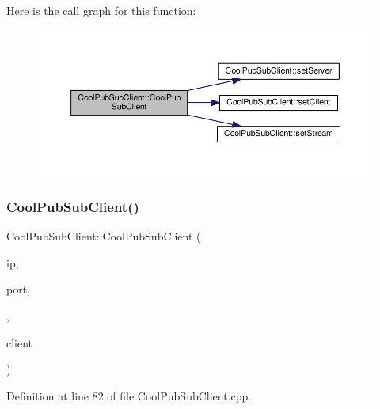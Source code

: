 Here is the call graph for this function\+:\nopagebreak
\begin{figure}[H]
\begin{center}
\leavevmode
\includegraphics[width=350pt]{class_cool_pub_sub_client_a3e7d7fa4b55e36f0ac8912335993d650_cgraph}
\end{center}
\end{figure}
\mbox{\label{class_cool_pub_sub_client_afc703702b40ba925377d0b9cd401319e}} 
\subsubsection{\texorpdfstring{Cool\+Pub\+Sub\+Client()}{CoolPubSubClient()}\hspace{0.1cm}{\footnotesize\ttfamily [9/14]}}
{\footnotesize\ttfamily Cool\+Pub\+Sub\+Client\+::\+Cool\+Pub\+Sub\+Client (\begin{DoxyParamCaption}\item[{uint8\+\_\+t $\ast$}]{ip,  }\item[{uint16\+\_\+t}]{port,  }\item[{\hyperlink{class_cool_pub_sub_client_a021ec75e9fbaf658370b8005ccfddc14}{M\+Q\+T\+T\+\_\+\+C\+A\+L\+L\+B\+A\+C\+K\+\_\+\+S\+I\+G\+N\+A\+T\+U\+RE}}]{,  }\item[{Client \&}]{client }\end{DoxyParamCaption})}



Definition at line 82 of file Cool\+Pub\+Sub\+Client.\+cpp.

